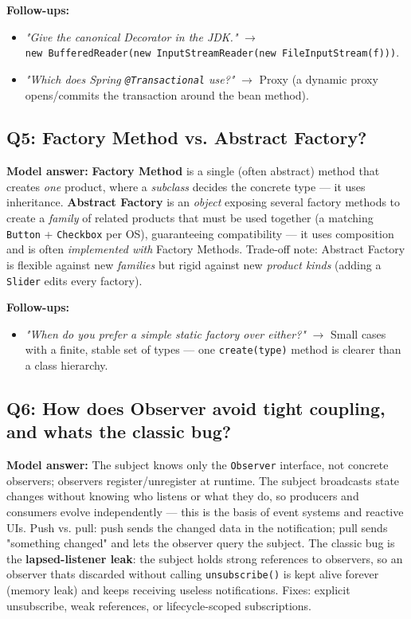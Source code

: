 \documentclass[11pt]{article}
\providecommand{\tightlist}{\setlength{\itemsep}{1pt}\setlength{\parskip}{0pt}}
\begin{document}
\textbf{Follow-ups:}

\begin{itemize}
\tightlist
\item
  \emph{"Give the canonical Decorator in the JDK."} \(\rightarrow\) \texttt{new\ BufferedReader(new\ InputStreamReader(new\ FileInputStream(f)))}.
\item
  \emph{"Which does Spring \texttt{@Transactional} use?"} \(\rightarrow\) Proxy (a dynamic proxy opens/commits the transaction around the bean method).
\end{itemize}

\subsection{Q5: Factory Method vs. Abstract Factory?}\label{q5-factory-method-vs-abstract-factory}

\textbf{Model answer:} \textbf{Factory Method} is a single (often abstract) method that creates \emph{one} product, where a \emph{subclass} decides the concrete type --- it uses inheritance. \textbf{Abstract Factory} is an \emph{object} exposing several factory methods to create a \emph{family} of related products that must be used together (a matching \texttt{Button} + \texttt{Checkbox} per OS), guaranteeing compatibility --- it uses composition and is often \emph{implemented with} Factory Methods. Trade-off note: Abstract Factory is flexible against new \emph{families} but rigid against new \emph{product kinds} (adding a \texttt{Slider} edits every factory).

\textbf{Follow-ups:}

\begin{itemize}
\tightlist
\item
  \emph{"When do you prefer a simple static factory over either?"} \(\rightarrow\) Small cases with a finite, stable set of types --- one \texttt{create(type)} method is clearer than a class hierarchy.
\end{itemize}

\subsection{Q6: How does Observer avoid tight coupling, and what\textquotesingle s the classic bug?}\label{q6-how-does-observer-avoid-tight-coupling-and-whats-the-classic-bug}

\textbf{Model answer:} The subject knows only the \texttt{Observer} interface, not concrete observers; observers register/unregister at runtime. The subject broadcasts state changes without knowing who listens or what they do, so producers and consumers evolve independently --- this is the basis of event systems and reactive UIs. Push vs. pull: push sends the changed data in the notification; pull sends "something changed" and lets the observer query the subject. The classic bug is the \textbf{lapsed-listener leak}: the subject holds strong references to observers, so an observer that\textquotesingle s discarded without calling \texttt{unsubscribe()} is kept alive forever (memory leak) and keeps receiving useless notifications. Fixes: explicit unsubscribe, weak references, or lifecycle-scoped subscriptions.
\end{document}
